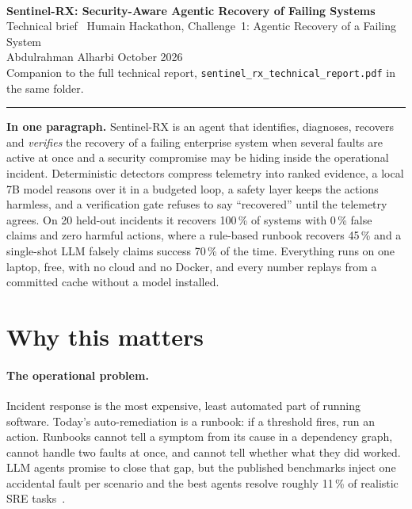 \documentclass[11pt,a4paper]{article}
\newcommand{\code}[1]{\texttt{#1}}
\newcommand{\pct}[1]{#1\,\%}
\begin{document}
\pagestyle{fancy}

\noindent{\color{accent}\rule{\textwidth}{1.2pt}}\\[0.8em]
{\color{accent}\LARGE\bfseries Sentinel-RX: Security-Aware Agentic Recovery of Failing Systems}\\[0.35em]
{\large Technical brief \textemdash\ Humain Hackathon, Challenge~1: Agentic Recovery of a Failing System}\\[0.35em]
{\normalsize Abdulrahman Alharbi \quad\textperiodcentered{} October 2026}\\[0.2em]
{\small\color{muted}Companion to the full technical report, \code{sentinel\_rx\_technical\_report.pdf} in the same folder.}\\[0.4em]
{\color{accent}\rule{\textwidth}{1.2pt}}

\vspace{0.8em}
\begin{summarybox}
\small\textbf{In one paragraph.} Sentinel-RX is an agent that identifies, diagnoses, recovers and
\emph{verifies} the recovery of a failing enterprise system when several faults are active at once
and a security compromise may be hiding inside the operational incident. Deterministic detectors
compress telemetry into ranked evidence, a local 7B model reasons over it in a budgeted loop, a
safety layer keeps the actions harmless, and a verification gate refuses to say ``recovered''
until the telemetry agrees. On 20 held-out incidents it recovers \pct{100} of systems with \pct{0}
false claims and zero harmful actions, where a rule-based runbook recovers \pct{45} and a single-shot
LLM falsely claims success \pct{70} of the time. Everything runs on one laptop, free, with no
cloud and no Docker, and every number replays from a committed cache without a model installed.
\end{summarybox}

\section{Why this matters}

\paragraph{The operational problem.} Incident response is the most expensive, least automated part
of running software. Today's auto-remediation is a runbook: if a threshold fires, run an action.
Runbooks cannot tell a symptom from its cause in a dependency graph, cannot handle two faults at
once, and cannot tell whether what they did worked. LLM agents promise to close that gap, but the
published benchmarks inject one accidental fault per scenario and the best agents resolve roughly
\pct{11} of realistic SRE tasks~\cite{itbench,openrca}.
\end{document}
